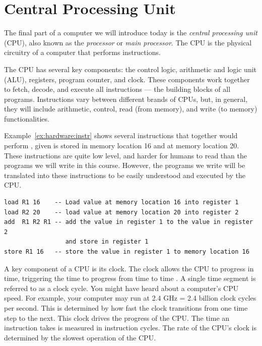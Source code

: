 \section {Central Processing Unit}

The final part of a computer we will introduce today is the \emph{central processing
unit} (CPU), also known as the \emph{processor} or \emph{main processor}. The CPU is the physical
circuitry of a computer that performs instructions.

The CPU has several key components: the control logic, arithmetic and logic unit (ALU), registers,
program counter, and clock. These components work together to 
fetch, decode, and execute all instructions --- the building blocks of all programs.
Instructions vary between different brands of CPUs, but, in general, they will
include arithmetic, control, read (from memory), and write (to memory) functionalities.

Example~\ref{ex:hardware:instr} shows several instructions
that together would perform , given  is stored in memory
location 16 and  at memory location 20. These instructions are quite low
level, and harder for humans to read than the programs we will write in this course.
However, the programs we write will be translated into these instructions to be
easily understood and executed by the CPU.

\begin{example}
\label{ex:hardware:instr}
\begin{verbatim}
load R1 16    -- Load value at memory location 16 into register 1
load R2 20    -- load value at memory location 20 into register 2
add  R1 R2 R1 -- add the value in register 1 to the value in register 2
                 and store in register 1
store R1 16   -- store the value in register 1 to memory location 16
\end{verbatim}
\end{example}

A key component of a CPU is its clock. The clock allows the CPU to progress in time,
triggering the time to progress from time  to time . A single time
segment is referred to as a clock cycle. You might have heard about a computer's CPU
speed. For example, your computer may run at 2.4 GHz = 2.4 billion clock cycles per second. This
is determined by how fast the clock transitions from one time step to the next. This
clock drives the progress of the CPU. The time an instruction takes is measured
in instruction cycles. The rate of the CPU's clock is determined by the slowest
operation of the CPU.

